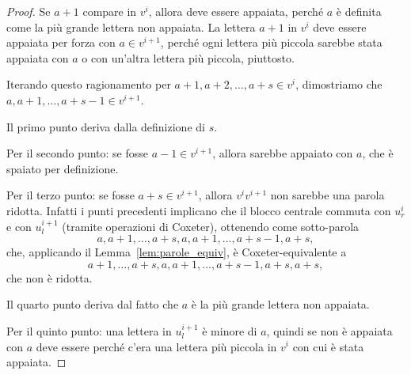 \begin{proof}
    Se $a+1$ compare in $v^i$, allora deve essere appaiata, perch\'e $a$ \`e definita come la 
    pi\`u grande lettera non appaiata.
    La lettera $a+1$ in $v^i$ deve essere appaiata per forza con $a \in v^{i+1}$, 
    perch\'e ogni lettera pi\`u piccola sarebbe stata appaiata con $a$ o con un'altra 
    lettera pi\`u piccola, piuttosto.

    Iterando questo ragionamento per $a+1, a+2, \dots, a+s \in v^i$, dimostriamo che 
    $a, a+1, \dots, a+s-1 \in v^{i+1}$.

    Il primo punto deriva dalla definizione di $s$.
    
    Per il secondo punto: se fosse $a-1 \in v^{i+1}$, allora sarebbe appaiato con $a$,
    che \`e spaiato per definizione.

    Per il terzo punto: se fosse $a+s \in v^{i+1}$, allora $v^i v^{i+1}$ non sarebbe
    una parola ridotta. 
    Infatti i punti precedenti implicano che il blocco centrale commuta con 
    $u^i_r$ e con $u^{i+1}_l$ (tramite operazioni di Coxeter), ottenendo come sotto-parola
    \[
        a, a+1, \dots, a+s, a, a+1, \dots, a+s-1, a+s,
    \]
    che, applicando il Lemma~\ref{lem:parole_equiv}, \`e Coxeter-equivalente a
    \[
        a+1, \dots, a+s, a, a+1, \dots, a+s-1, a+s, a+s,
    \]
    che non \`e ridotta.

    Il quarto punto deriva dal fatto che $a$ \`e la pi\`u grande lettera non appaiata.

    Per il quinto punto: una lettera in $u^{i+1}_l$ \`e minore di $a$, quindi se
    non \`e appaiata con $a$ deve essere perch\'e c'era una lettera pi\`u piccola 
    in $v^i$ con cui \`e stata appaiata.
\end{proof}

